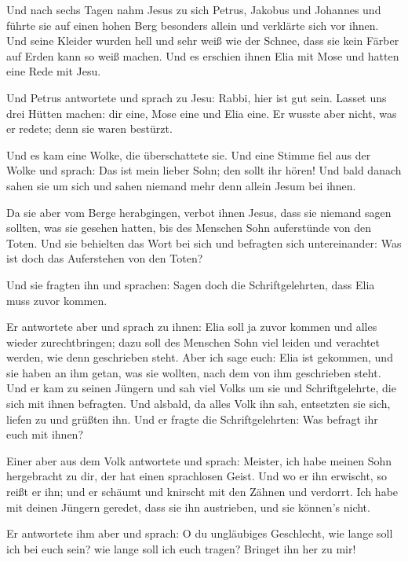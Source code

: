  Und nach sechs Tagen nahm Jesus zu sich Petrus, Jakobus
und Johannes und führte sie auf einen hohen Berg besonders allein und
verklärte sich vor ihnen.  Und seine Kleider wurden hell
und sehr weiß wie der Schnee, dass sie kein Färber auf Erden kann so
weiß machen.  Und es erschien ihnen Elia mit Mose und
hatten eine Rede mit Jesu.

 Und Petrus antwortete und sprach zu Jesu: Rabbi, hier ist
gut sein. Lasset uns drei Hütten machen: dir eine, Mose eine und Elia
eine.  Er wusste aber nicht, was er redete; denn sie waren
bestürzt.

 Und es kam eine Wolke, die überschattete sie. Und eine
Stimme fiel aus der Wolke und sprach: Das ist mein lieber Sohn; den
sollt ihr hören!  Und bald danach sahen sie um sich und
sahen niemand mehr denn allein Jesum bei ihnen.

 Da sie aber vom Berge herabgingen, verbot ihnen Jesus,
dass sie niemand sagen sollten, was sie gesehen hatten, bis des Menschen
Sohn auferstünde von den Toten.  Und sie behielten das
Wort bei sich und befragten sich untereinander: Was ist doch das
Auferstehen von den Toten?

 Und sie fragten ihn und sprachen: Sagen doch die
Schriftgelehrten, dass Elia muss zuvor kommen.

 Er antwortete aber und sprach zu ihnen: Elia soll ja
zuvor kommen und alles wieder zurechtbringen; dazu soll des Menschen
Sohn viel leiden und verachtet werden, wie denn geschrieben steht.
 Aber ich sage euch: Elia ist gekommen, und sie haben an
ihm getan, was sie wollten, nach dem von ihm geschrieben steht.
 Und er kam zu seinen Jüngern und sah viel Volks um sie
und Schriftgelehrte, die sich mit ihnen befragten.  Und
alsbald, da alles Volk ihn sah, entsetzten sie sich, liefen zu und
grüßten ihn.  Und er fragte die Schriftgelehrten: Was
befragt ihr euch mit ihnen?

 Einer aber aus dem Volk antwortete und sprach: Meister,
ich habe meinen Sohn hergebracht zu dir, der hat einen sprachlosen
Geist.  Und wo er ihn erwischt, so reißt er ihn; und er
schäumt und knirscht mit den Zähnen und verdorrt. Ich habe mit deinen
Jüngern geredet, dass sie ihn austrieben, und sie können's nicht.

 Er antwortete ihm aber und sprach: O du ungläubiges
Geschlecht, wie lange soll ich bei euch sein? wie lange soll ich euch
tragen? Bringet ihn her zu mir!

